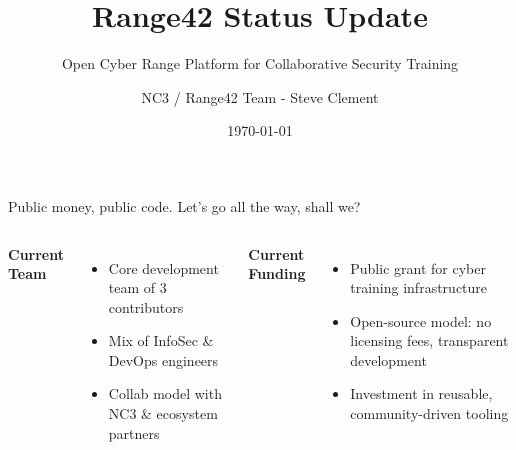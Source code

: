 \documentclass[aspectratio=169]{beamer}
\title{\faIcon{shield-alt}\; Range42 Status Update}
\subtitle{Open Cyber Range Platform for Collaborative Security Training}
\author{NC3 / Range42 Team - Steve Clement}
\date{\today}
\institute{\faServer\; Proxmox \quad \faCogs\; Ansible \quad \faProjectDiagram\; Orchestration \quad \faBinoculars\; Telemetry}
\begin{document}
\begin{frame}[plain]
  \titlepage
\end{frame}



\begin{frame}[shrink=8]{Public money, public code. Let's go all the way, shall we?}
  \begin{columns}[T]
    \textbf{Current Team}
    \begin{itemize}
      \item Core development team of 3 contributors
      \item Mix of InfoSec \& DevOps engineers
      \item Collab model with NC3 \& ecosystem partners
    \end{itemize}
    
    \textbf{Current Funding}
    \begin{itemize}
      \item Public grant for cyber training infrastructure
      \item Open-source model: no licensing fees, transparent development
      \item Investment in reusable, community-driven tooling
    \end{itemize}
    

\end{columns}
\end{frame}
\end{document}
